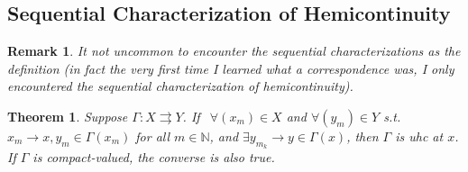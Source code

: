 \documentclass{article}
\newcommand{\N}{\mathbb{N}}
\newcommand{\toto}{\rightrightarrows}
\theoremstyle{mythm}
\newtheorem{theorem}{Theorem}
\theoremstyle{mydef}
\newtheorem{remark}{Remark}
\begin{document}
\subsection{Sequential Characterization of Hemicontinuity}
\label{ssub:sequential_characterization_of_hemicontinuity}
\begin{remark}
  It not uncommon to encounter the sequential characterizations as the definition (in fact the very first time I learned what a correspondence was, I only encountered the sequential characterization of hemicontinuity).
\end{remark}

\begin{theorem}\label{thm:lecture3_compactness_uhc_sequential}
  Suppose $\Gamma: X \toto Y$. If $~~\forall (x_m) \in X$ and $\forall (y_m) \in Y$ s.t. $x_m \to x, y_m \in \Gamma(x_m)$ for all $m\in\N$, and $\exists y_{m_k} \to y\in \Gamma(x)$, then $\Gamma$ is uhc at $x$. If $\Gamma$ is compact-valued, the converse is also true.
\end{theorem}
\end{document}

